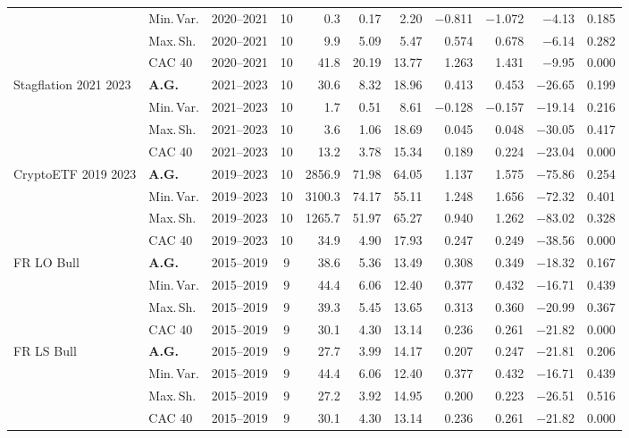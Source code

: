 \begin{longtable}{p{2.6cm} l c c r r r r r r r}
 & Min.\,Var. & 2020--2021 & 10 & 0.3 & 0.17 & 2.20 & $-$0.811 & $-$1.072 & $-$4.13 & 0.185 \\
 & Max.\,Sh. & 2020--2021 & 10 & 9.9 & 5.09 & 5.47 & 0.574 & 0.678 & $-$6.14 & 0.282 \\
 & CAC 40 & 2020--2021 & 10 & 41.8 & 20.19 & 13.77 & 1.263 & 1.431 & $-$9.95 & 0.000 \\
\midrule
Stagflation 2021 2023 & \textbf{A.G.} & 2021--2023 & 10 & 30.6 & 8.32 & 18.96 & 0.413 & 0.453 & $-$26.65 & 0.199 \\
 & Min.\,Var. & 2021--2023 & 10 & 1.7 & 0.51 & 8.61 & $-$0.128 & $-$0.157 & $-$19.14 & 0.216 \\
 & Max.\,Sh. & 2021--2023 & 10 & 3.6 & 1.06 & 18.69 & 0.045 & 0.048 & $-$30.05 & 0.417 \\
 & CAC 40 & 2021--2023 & 10 & 13.2 & 3.78 & 15.34 & 0.189 & 0.224 & $-$23.04 & 0.000 \\
\midrule
CryptoETF 2019 2023 & \textbf{A.G.} & 2019--2023 & 10 & 2856.9 & 71.98 & 64.05 & 1.137 & 1.575 & $-$75.86 & 0.254 \\
 & Min.\,Var. & 2019--2023 & 10 & 3100.3 & 74.17 & 55.11 & 1.248 & 1.656 & $-$72.32 & 0.401 \\
 & Max.\,Sh. & 2019--2023 & 10 & 1265.7 & 51.97 & 65.27 & 0.940 & 1.262 & $-$83.02 & 0.328 \\
 & CAC 40 & 2019--2023 & 10 & 34.9 & 4.90 & 17.93 & 0.247 & 0.249 & $-$38.56 & 0.000 \\
\midrule
FR LO Bull & \textbf{A.G.} & 2015--2019 & 9 & 38.6 & 5.36 & 13.49 & 0.308 & 0.349 & $-$18.32 & 0.167 \\
 & Min.\,Var. & 2015--2019 & 9 & 44.4 & 6.06 & 12.40 & 0.377 & 0.432 & $-$16.71 & 0.439 \\
 & Max.\,Sh. & 2015--2019 & 9 & 39.3 & 5.45 & 13.65 & 0.313 & 0.360 & $-$20.99 & 0.367 \\
 & CAC 40 & 2015--2019 & 9 & 30.1 & 4.30 & 13.14 & 0.236 & 0.261 & $-$21.82 & 0.000 \\
\midrule
FR LS Bull & \textbf{A.G.} & 2015--2019 & 9 & 27.7 & 3.99 & 14.17 & 0.207 & 0.247 & $-$21.81 & 0.206 \\
 & Min.\,Var. & 2015--2019 & 9 & 44.4 & 6.06 & 12.40 & 0.377 & 0.432 & $-$16.71 & 0.439 \\
 & Max.\,Sh. & 2015--2019 & 9 & 27.2 & 3.92 & 14.95 & 0.200 & 0.223 & $-$26.51 & 0.516 \\
 & CAC 40 & 2015--2019 & 9 & 30.1 & 4.30 & 13.14 & 0.236 & 0.261 & $-$21.82 & 0.000 \\
\midrule

\end{longtable}

